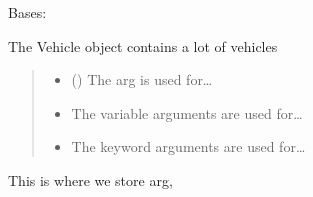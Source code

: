 \documentclass[letterpaper,10pt,english]{sphinxmanual}
\begin{document}
\begin{fulllineitems}
\label{\detokenize{_autosummary/module.submodule.dummycode.GoogleVehicle:module.submodule.dummycode.GoogleVehicle}}
\pysigstartsignatures
{}
\pysigstopsignatures
\sphinxAtStartPar
Bases: 

\sphinxAtStartPar
The Vehicle object contains a lot of vehicles
\begin{quote}\begin{description}
\begin{itemize}
\item {} 
\sphinxAtStartPar
{} () \textendash{} The arg is used for…

\item {} 
\sphinxAtStartPar
{} \textendash{} The variable arguments are used for…

\item {} 
\sphinxAtStartPar
{} \textendash{} The keyword arguments are used for…

\end{itemize}

\end{description}\end{quote}

\begin{fulllineitems}
\label{\detokenize{_autosummary/module.submodule.dummycode.GoogleVehicle:module.submodule.dummycode.GoogleVehicle.arg}}
\pysigstartsignatures
{}
\pysigstopsignatures
\sphinxAtStartPar
This is where we store arg,
\begin{quote}\begin{description}
\sphinxAtStartPar
{}

\end{description}\end{quote}


\end{fulllineitems}
\end{fulllineitems}
\end{document}
